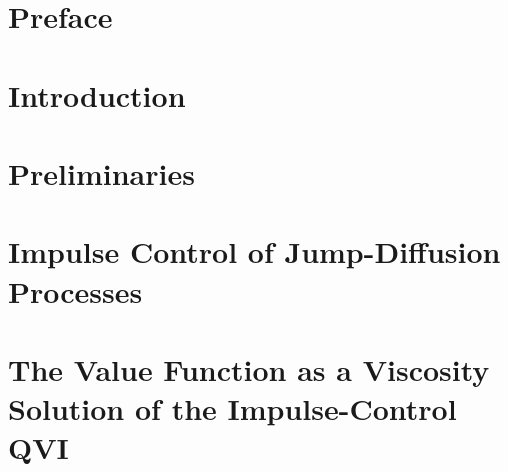 \documentclass[a4paper, 12pt, openany, twoside]{book}
\makeatletter
\renewcommand{\headrulewidth}{0pt}%
\renewcommand{\headrulewidth}{0pt}%
\newcommand{\blacktitlesbluepages}[1]{%
    \begingroup
    \let\oldcontentsline\contentsline
    \def\contentsline##1##2##3##4{%
        \oldcontentsline{##1}{{\color{black}##2}}{{\color{NavyBlue}##3}}{##4}%
    }%
    #1%
    \endgroup
}
\newcommand{\clearemptydoublepage}{%
    \clearpage
    \if@twoside
        \ifodd\c@page
        \else
            \hbox{}%
            \thispagestyle{empty}%
            \newpage
            \if@twocolumn
                \hbox{}%
                \thispagestyle{empty}%
                \newpage
            \fi
        \fi
    \fi
}
\renewcommand{\cleardoublepage}{\clearemptydoublepage}
\theoremstyle{plain}
\theoremstyle{definition}
\theoremstyle{remark}
\numberwithin{equation}{section}
\makeatother
\begin{document}
\chapter*{Preface}
{}

\cleardoublepage

{}
\blacktitlesbluepages{\tableofcontents}

\cleardoublepage
{}
{}
\blacktitlesbluepages{\listoffigures}

\cleardoublepage
{}
{}
\blacktitlesbluepages{\listoftables}


\pagestyle{fancy} %
\fancyhf{} %
\renewcommand{\headrulewidth}{0pt} %
\fancyhead[LE, RO]{\thepage} %
\fancyhead[RE, LO]{\leftmark} %
\setlength{\headheight}{14.49998pt} %

\mainmatter

\chapter{Introduction}

\cleardoublepage

\chapter{Preliminaries}

\cleardoublepage

\chapter{Impulse Control of Jump-Diffusion Processes}

\cleardoublepage

\chapter{The Value Function as a Viscosity Solution of the Impulse-Control QVI}

\cleardoublepage
\end{document}
